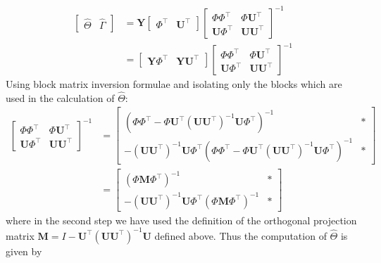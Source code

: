 \documentclass[11pt]{report} %
\begin{document}
\begin{align}
\begin{bmatrix}
\widehat{\Theta} & \widehat{\Gamma}
\end{bmatrix} &= \mathbf{Y}\begin{bmatrix}
\Phi^{\top} & \mathbf{U}^{\top}\end{bmatrix}\begin{bmatrix}
\Phi\Phi^{\top} & \Phi\mathbf{U}^{\top} \\ \mathbf{U}\Phi^{\top} & \mathbf{U}\mathbf{U}^{\top}
\end{bmatrix}^{-1} \\
&= \begin{bmatrix}
\mathbf{Y}\Phi^{\top} & \mathbf{Y}\mathbf{U}^{\top}\end{bmatrix}\begin{bmatrix}
\Phi\Phi^{\top} & \Phi\mathbf{U}^{\top} \\ \mathbf{U}\Phi^{\top} & \mathbf{U}\mathbf{U}^{\top}
\end{bmatrix}^{-1}
\end{align}
Using block matrix inversion formulae and isolating only the blocks which are used in the calculation of $\widehat{\Theta}$:
\begin{align}
\begin{bmatrix}\Phi\Phi^{\top} & \Phi\mathbf{U}^{\top}\\
\mathbf{U}\Phi^{\top} & \mathbf{U}\mathbf{U}^{\top}
\end{bmatrix}^{-1} &= \begin{bmatrix}\left(\Phi\Phi^{\top}-\Phi\mathbf{U}^{\top}\left(\mathbf{U}\mathbf{U}^{\top}\right)^{-1}\mathbf{U}\Phi^{\top}\right)^{-1} & *\\
-\left(\mathbf{U}\mathbf{U}^{\top}\right)^{-1}\mathbf{U}\Phi^{\top}\left(\Phi\Phi^{\top}-\Phi\mathbf{U}^{\top}\left(\mathbf{U}\mathbf{U}^{\top}\right)^{-1}\mathbf{U}\Phi^{\top}\right)^{-1} & *
\end{bmatrix} \\
&= \begin{bmatrix}\left(\Phi\mathbf{M}\Phi^{\top}\right)^{-1} & *\\
-\left(\mathbf{U}\mathbf{U}^{\top}\right)^{-1}\mathbf{U}\Phi^{\top}\left(\Phi\mathbf{M}\Phi^{\top}\right)^{-1} & *
\end{bmatrix}
\end{align}
where in the second step we have used the definition of the orthogonal projection matrix $\mathbf{M} = I - \mathbf{U}^{\top}\left(\mathbf{U}\mathbf{U}^{\top}\right)^{-1}\mathbf{U}$ defined above. Thus the computation of $\widehat{\Theta}$ is given by
\end{document}
